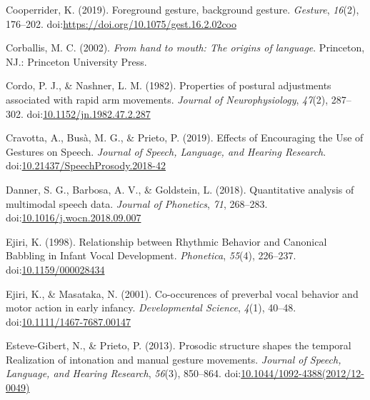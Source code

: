 \documentclass[
  man,floatsintext]{apa6}
\newlength{\cslhangindent}
\newenvironment{cslreferences}%
  {\setlength{\parindent}{0pt}%
  \everypar{\setlength{\hangindent}{\cslhangindent}}\ignorespaces}%
  {\par}
\begin{document}
\begingroup
\setlength{\parindent}{-0.5in}
\setlength{\leftskip}{0.5in}

\hypertarget{refs}{}
\begin{cslreferences}
\leavevmode\hypertarget{ref-cooperriderForegroundGestureBackground2019}{}%
Cooperrider, K. (2019). Foreground gesture, background gesture. \emph{Gesture}, \emph{16}(2), 176--202. doi:\href{https://doi.org/https://doi.org/10.1075/gest.16.2.02coo}{https://doi.org/10.1075/gest.16.2.02coo}

\leavevmode\hypertarget{ref-corballisHandMouthOrigins2002}{}%
Corballis, M. C. (2002). \emph{From hand to mouth: The origins of language}. Princeton, NJ.: Princeton University Press.

\leavevmode\hypertarget{ref-cordoPropertiesPosturalAdjustments1982}{}%
Cordo, P. J., \& Nashner, L. M. (1982). Properties of postural adjustments associated with rapid arm movements. \emph{Journal of Neurophysiology}, \emph{47}(2), 287--302. doi:\href{https://doi.org/10.1152/jn.1982.47.2.287}{10.1152/jn.1982.47.2.287}

\leavevmode\hypertarget{ref-cravottaEffectsEncouragingUse2019}{}%
Cravotta, A., Busà, M. G., \& Prieto, P. (2019). Effects of Encouraging the Use of Gestures on Speech. \emph{Journal of Speech, Language, and Hearing Research}. doi:\href{https://doi.org/10.21437/SpeechProsody.2018-42}{10.21437/SpeechProsody.2018-42}

\leavevmode\hypertarget{ref-dannerQuantitativeAnalysisMultimodal2018}{}%
Danner, S. G., Barbosa, A. V., \& Goldstein, L. (2018). Quantitative analysis of multimodal speech data. \emph{Journal of Phonetics}, \emph{71}, 268--283. doi:\href{https://doi.org/10.1016/j.wocn.2018.09.007}{10.1016/j.wocn.2018.09.007}

\leavevmode\hypertarget{ref-ejiriRelationshipRhythmicBehavior1998}{}%
Ejiri, K. (1998). Relationship between Rhythmic Behavior and Canonical Babbling in Infant Vocal Development. \emph{Phonetica}, \emph{55}(4), 226--237. doi:\href{https://doi.org/10.1159/000028434}{10.1159/000028434}

\leavevmode\hypertarget{ref-ejiriCooccurencesPreverbalVocal2001}{}%
Ejiri, K., \& Masataka, N. (2001). Co-occurences of preverbal vocal behavior and motor action in early infancy. \emph{Developmental Science}, \emph{4}(1), 40--48. doi:\href{https://doi.org/10.1111/1467-7687.00147}{10.1111/1467-7687.00147}

\leavevmode\hypertarget{ref-esteve-gibertProsodicStructureShapes2013}{}%
Esteve-Gibert, N., \& Prieto, P. (2013). Prosodic structure shapes the temporal Realization of intonation and manual gesture movements. \emph{Journal of Speech, Language, and Hearing Research}, \emph{56}(3), 850--864. doi:\href{https://doi.org/10.1044/1092-4388(2012/12-0049)}{10.1044/1092-4388(2012/12-0049)}


\end{cslreferences}
\end{document}
